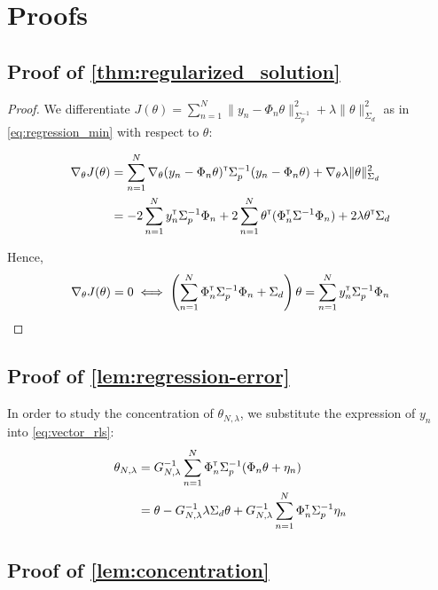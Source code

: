\documentclass{article}
\begin{document}



\appendix

\section{Proofs}

\subsection{Proof of \autoref{thm:regularized_solution}}

\begin{proof}
We differentiate $J(\theta) = \sum_{n=1}^N \|y_n -\Phi_n\theta\|_{\Sigma_p^{-1}}^2 + \lambda\|\theta\|_{\Sigma_d}^2$ as in  \eqref{eq:regression_min} with respect to $\theta$:

\begin{align*}
    \nabla_{\theta} J(\theta) &= \sum_{n=1}^N\nabla_{\theta} (y_n - \Phi_n\theta)^{\mathsf{\scriptscriptstyle T}}\Sigma_p^{-1}(y_n - \Phi_n\theta) + \nabla_{\theta} \lambda\|\theta\|_{\Sigma_d}^2\\
    &= -2\sum_{n=1}^N y_n^{\mathsf{\scriptscriptstyle T}}\Sigma_p^{-1}\Phi_n + 2\sum_{n=1}^N\theta^{\mathsf{\scriptscriptstyle T}}(\Phi_n^{\mathsf{\scriptscriptstyle T}}\Sigma^{-1}\Phi_n) +  2 \lambda \theta^{\mathsf{\scriptscriptstyle T}} \Sigma_d
\end{align*}

Hence,
\begin{align*}
    \nabla_{\theta} J(\theta) = 0 \iff \left(\sum_{n=1}^N\Phi_n^{\mathsf{\scriptscriptstyle T}}\Sigma_p^{-1}\Phi_n + \Sigma_d\right)\theta = \sum_{n=1}^N y_n^{\mathsf{\scriptscriptstyle T}}\Sigma_p^{-1}\Phi_n
\end{align*}
\end{proof}

\subsection{Proof of \autoref{lem:regression-error}}

In order to study the concentration of $\theta_{N,\lambda}$, we substitute the expression of $y_n$ into \eqref{eq:vector_rls}:
\begin{align*}
    \theta_{N,\lambda} &= G_{N, \lambda}^{-1} \sum_{n=1}^N \Phi_n^{\mathsf{\scriptscriptstyle T}} \Sigma_p^{-1} (\Phi_n\theta +\eta_n)\\
    &= \theta - G_{N, \lambda}^{-1}\lambda\Sigma_d\theta + G_{N, \lambda}^{-1}\sum_{n=1}^N \Phi_n^{\mathsf{\scriptscriptstyle T}} \Sigma_p^{-1}\eta_n
\end{align*}

\subsection{Proof of \autoref{lem:concentration}}
\end{document}

